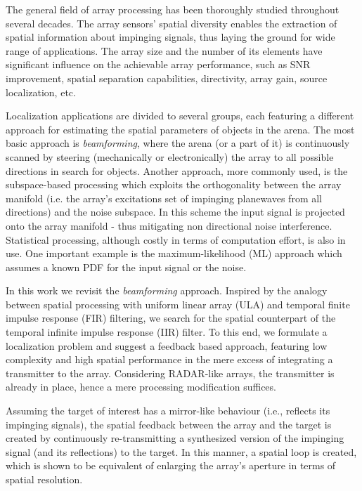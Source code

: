 The general field of array processing has been thoroughly studied throughout several decades.
The array sensors' spatial diversity enables the extraction of spatial information about impinging signals, thus laying the ground for wide range of applications.
The array size and the number of its elements have significant influence on the achievable array performance, such as \gls{SNR} improvement, spatial separation capabilities, directivity, array gain, source localization, etc.
\par 
Localization applications are divided to several groups, each featuring a different approach for estimating the spatial parameters of objects in the arena.
The most basic approach is \emph{beamforming}, where the arena (or a part of it) is continuously scanned by steering (mechanically or electronically) the array to all possible directions in search for objects.
Another approach, more commonly used, is the subspace-based processing which exploits the orthogonality between the array manifold (i.e. the array's excitations set of impinging planewaves from all directions) and the noise subspace.
In this scheme the input signal is projected onto the array manifold - thus mitigating non directional noise interference. 
Statistical processing, although costly in terms of computation effort, is also in use.
One important example is the maximum-likelihood (ML) approach which assumes a known \gls{PDF} for the input signal or the noise.
\par
In this work we revisit the \emph{beamforming} approach.
Inspired by the analogy between spatial processing with uniform linear array (ULA) and temporal finite impulse response (FIR) filtering, we search for the spatial counterpart of the temporal infinite impulse response (IIR) filter.
To this end, we formulate a localization problem and suggest a feedback based approach, featuring low complexity and high spatial performance in the mere excess of integrating a transmitter to the array.
Considering RADAR-like arrays, the transmitter is already in place, hence a mere processing modification suffices.
\par  
Assuming the target of interest has a mirror-like behaviour (i.e., reflects its impinging signals), the spatial feedback between the array and the target is created by continuously re-transmitting a synthesized version of the impinging signal (and its reflections) to the target.
In this manner, a spatial loop is created, which is shown to be equivalent of enlarging the array's aperture in terms of spatial resolution.
\par 
